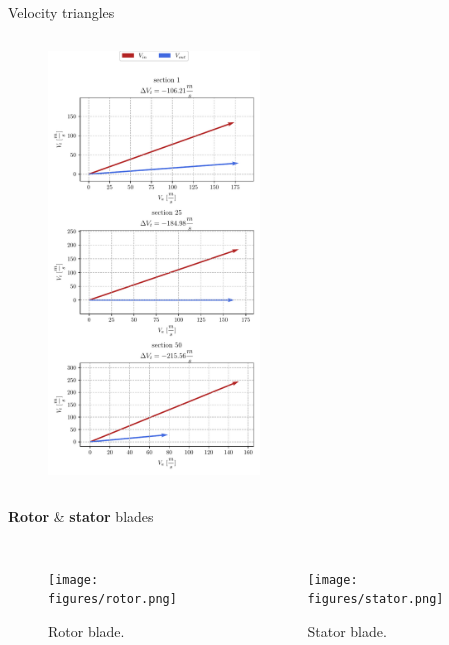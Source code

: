 {\begin{frame}{Velocity triangles}
\begin{columns}
\begin{figure}
					\includegraphics[width=0.5\textwidth]{figures/statorVelocityTriangle.pdf}
				\end{figure}
		\end{columns}
	\end{frame}
	}
	
	\begin{frame}{\textbf{Rotor} \& \textbf{stator} blades}
		\begin{columns}
				\begin{figure}
					\hspace{-2cm}
					\texttt{[image: figures/rotor.png]}
					\caption{Rotor blade.}
				\end{figure}
				\begin{figure}
					\hspace{-2cm}
					\texttt{[image: figures/stator.png]}
					\caption{Stator blade.}
				\end{figure}
		\end{columns}
	\end{frame}
	
